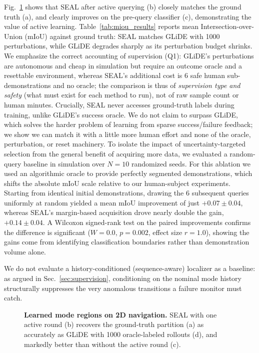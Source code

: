 Fig.~\ref{fig:comparison} shows that SEAL after active querying (b) closely matches the ground truth (a), and clearly improves on the pre-query classifier (c), demonstrating the value of active learning. Table~\ref{tab:miou_results} reports mean Intersection-over-Union (mIoU) against ground truth: SEAL matches GLiDE with 1000 perturbations, while GLiDE degrades sharply as its perturbation budget shrinks. We emphasize the correct accounting of supervision (Q1): GLiDE's perturbations are autonomous and cheap in simulation but require an outcome oracle and a resettable environment, whereas SEAL's additional cost is 6 safe human sub-demonstrations and no oracle; the comparison is thus of \emph{supervision type and safety} (what must exist for each method to run), not of raw sample count or human minutes. Crucially, SEAL never accesses ground-truth labels during training, unlike GLiDE's success oracle. We do not claim to surpass GLiDE, which solves the harder problem of learning from sparse success/failure feedback; we show we can match it with a little more human effort and none of the oracle, perturbation, or reset machinery.
To isolate the impact of uncertainty-targeted selection from the general benefit of acquiring more data, we evaluated a random-query baseline in simulation over $N=10$ randomized seeds. For this ablation we used an algorithmic oracle to provide perfectly segmented demonstrations, which shifts the absolute mIoU scale relative to our human-subject experiments. Starting from identical initial demonstrations, drawing the 6 subsequent queries uniformly at random yielded a mean mIoU improvement of just $+0.07 \pm 0.04$, whereas SEAL's margin-based acquisition drove nearly double the gain, $+0.14 \pm 0.04$. A Wilcoxon signed-rank test on the paired improvements confirms the difference is significant ($W{=}0.0$, $p{=}0.002$, effect size $r{=}1.0$), showing the gains come from identifying classification boundaries rather than demonstration volume alone.

We do not evaluate a history-conditioned (sequence-aware) localizer as a baseline: as argued in Sec.~\ref{sec:supervision}, conditioning on the nominal mode history structurally suppresses the very anomalous transitions a failure monitor must catch.



\begin{figure}[htbp]
\centering

\caption{\textbf{Learned mode regions on 2D navigation.} SEAL with one active round (b) recovers the ground-truth partition (a) as accurately as GLiDE with 1000 oracle-labeled rollouts (d), and markedly better than without the active round (c).}
\label{fig:comparison}
\end{figure}

